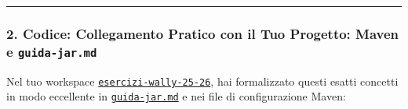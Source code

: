 \documentclass[11pt,a4paper]{article}
\newcommand{\passthrough}[1]{#1}
\begin{document}
\begin{center}\rule{0.5\linewidth}{0.5pt}\end{center}

\subsubsection{\texorpdfstring{2. Codice: Collegamento Pratico con il
Tuo Progetto: Maven e
\texttt{guida-jar.md}}{2. Codice: Collegamento Pratico con il Tuo Progetto: Maven e guida-jar.md}}\label{codice-collegamento-pratico-con-il-tuo-progetto-maven-e-guida-jar.md}

Nel tuo workspace
\href{file:///home/wally/Documenti/GitHub/Programmazione-II/25-26/esercizi-wally-25-26}{\passthrough{\lstinline!esercizi-wally-25-26!}},
hai formalizzato questi esatti concetti in modo eccellente in
\href{file:///home/wally/Documenti/GitHub/Programmazione-II/25-26/esercizi-wally-25-26/guida-jar.md}{\passthrough{\lstinline!guida-jar.md!}}
e nei file di configurazione Maven:
\end{document}
